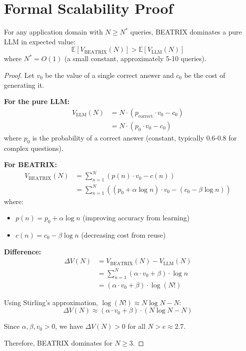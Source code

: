 \section{Formal Scalability Proof}
\label{sec:bx-proof}

\begin{theorem}
\label{thm:bx-scalability}
For any application domain with $N \geq N^*$ queries, BEATRIX dominates a pure LLM in expected value:
\begin{equation}
\mathbb{E}[V_{\text{BEATRIX}}(N)] > \mathbb{E}[V_{\text{LLM}}(N)]
\end{equation}
where $N^* = O(1)$ (a small constant, approximately 5-10 queries).
\end{theorem}

\begin{proof}
Let $v_0$ be the value of a single correct answer and $c_0$ be the cost of generating it.

\textbf{For the pure LLM:}
\begin{align}
V_{\text{LLM}}(N) &= N \cdot (p_{\text{correct}} \cdot v_0 - c_0) \\
&= N \cdot (p_0 \cdot v_0 - c_0)
\end{align}
where $p_0$ is the probability of a correct answer (constant, typically 0.6-0.8 for complex questions).

\textbf{For BEATRIX:}
\begin{align}
V_{\text{BEATRIX}}(N) &= \sum_{n=1}^{N} \left( p(n) \cdot v_0 - c(n) \right) \\
&= \sum_{n=1}^{N} \left( (p_0 + \alpha \log n) \cdot v_0 - (c_0 - \beta \log n) \right)
\end{align}
where:
\begin{itemize}[nosep]
    \item $p(n) = p_0 + \alpha \log n$ (improving accuracy from learning)
    \item $c(n) = c_0 - \beta \log n$ (decreasing cost from reuse)
\end{itemize}

\textbf{Difference:}
\begin{align}
\Delta V(N) &= V_{\text{BEATRIX}}(N) - V_{\text{LLM}}(N) \\
&= \sum_{n=1}^{N} \left( \alpha \cdot v_0 + \beta \right) \cdot \log n \\
&= (\alpha \cdot v_0 + \beta) \cdot \log(N!)
\end{align}

Using Stirling's approximation, $\log(N!) \approx N \log N - N$:
\begin{equation}
\Delta V(N) \approx (\alpha \cdot v_0 + \beta) \cdot (N \log N - N)
\end{equation}

Since $\alpha, \beta, v_0 > 0$, we have $\Delta V(N) > 0$ for all $N > e \approx 2.7$.

Therefore, BEATRIX dominates for $N \geq 3$.
\end{proof}


